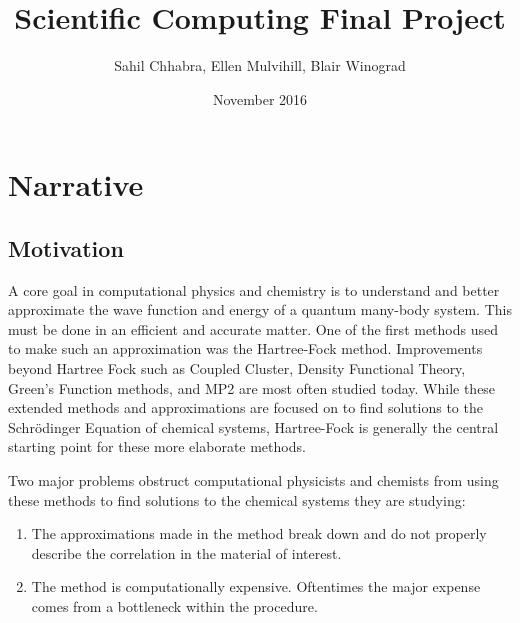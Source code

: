 \documentclass{article}
\title{Scientific Computing Final Project}
\author{Sahil Chhabra, Ellen Mulvihill, Blair Winograd}
\date{November 2016}
\begin{document}
\maketitle

\section{Narrative}


\subsection{Motivation}
\quad A core goal in computational physics and chemistry is to understand and better approximate the wave function and energy of a quantum many-body system.  This must be done in an efficient and accurate matter.  One of the first methods used to make such an approximation was the Hartree-Fock method.  Improvements beyond Hartree Fock such as Coupled Cluster, Density Functional Theory, Green's Function methods, and MP2 are most often studied today.  While these extended methods and approximations are focused on to find solutions to the Schr\"{o}dinger Equation of chemical systems, Hartree-Fock is generally the central starting point for these more elaborate methods.  \newline
\par \quad Two major problems obstruct computational physicists and chemists from using these methods to find solutions to the chemical systems they are studying:

\begin{enumerate} 
    \item The approximations made in the method break down and do not properly describe the correlation in the material of interest.
    \item The method is computationally expensive.  Oftentimes the major expense comes from a bottleneck within the procedure.
\end{enumerate} 
\end{document}
